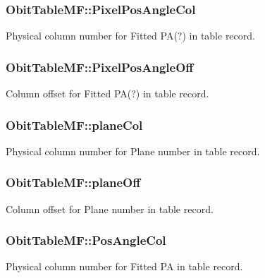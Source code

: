\subsubsection{ {\bf Obit\-Table\-MF::Pixel\-Pos\-Angle\-Col}}\label{structObitTableMF_o97}


Physical column number for Fitted PA(?) in table record. 

\subsubsection{ {\bf Obit\-Table\-MF::Pixel\-Pos\-Angle\-Off}}\label{structObitTableMF_o96}


Column offset for Fitted PA(?) in table record. 

\subsubsection{ {\bf Obit\-Table\-MF::plane\-Col}}\label{structObitTableMF_o21}


Physical column number for Plane number in table record. 

\subsubsection{ {\bf Obit\-Table\-MF::plane\-Off}}\label{structObitTableMF_o20}


Column offset for Plane number in table record. 

\subsubsection{ {\bf Obit\-Table\-MF::Pos\-Angle\-Col}}\label{structObitTableMF_o35}


Physical column number for Fitted PA in table record. 

